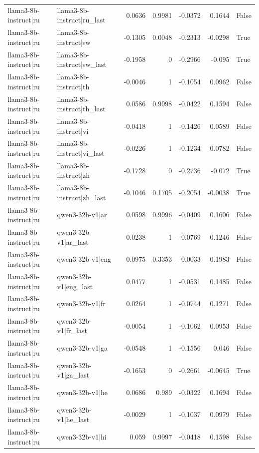 \begin{table}
\begin{tabular}{l l r r r r l}
llama3-8b-instruct|ru & llama3-8b-instruct|ru_last & 0.0636 & 0.9981 & -0.0372 & 0.1644 & False \\
llama3-8b-instruct|ru & llama3-8b-instruct|sw & -0.1305 & 0.0048 & -0.2313 & -0.0298 & True \\
llama3-8b-instruct|ru & llama3-8b-instruct|sw_last & -0.1958 & 0 & -0.2966 & -0.095 & True \\
llama3-8b-instruct|ru & llama3-8b-instruct|th & -0.0046 & 1 & -0.1054 & 0.0962 & False \\
llama3-8b-instruct|ru & llama3-8b-instruct|th_last & 0.0586 & 0.9998 & -0.0422 & 0.1594 & False \\
llama3-8b-instruct|ru & llama3-8b-instruct|vi & -0.0418 & 1 & -0.1426 & 0.0589 & False \\
llama3-8b-instruct|ru & llama3-8b-instruct|vi_last & -0.0226 & 1 & -0.1234 & 0.0782 & False \\
llama3-8b-instruct|ru & llama3-8b-instruct|zh & -0.1728 & 0 & -0.2736 & -0.072 & True \\
llama3-8b-instruct|ru & llama3-8b-instruct|zh_last & -0.1046 & 0.1705 & -0.2054 & -0.0038 & True \\
llama3-8b-instruct|ru & qwen3-32b-v1|ar & 0.0598 & 0.9996 & -0.0409 & 0.1606 & False \\
llama3-8b-instruct|ru & qwen3-32b-v1|ar_last & 0.0238 & 1 & -0.0769 & 0.1246 & False \\
llama3-8b-instruct|ru & qwen3-32b-v1|eng & 0.0975 & 0.3353 & -0.0033 & 0.1983 & False \\
llama3-8b-instruct|ru & qwen3-32b-v1|eng_last & 0.0477 & 1 & -0.0531 & 0.1485 & False \\
llama3-8b-instruct|ru & qwen3-32b-v1|fr & 0.0264 & 1 & -0.0744 & 0.1271 & False \\
llama3-8b-instruct|ru & qwen3-32b-v1|fr_last & -0.0054 & 1 & -0.1062 & 0.0953 & False \\
llama3-8b-instruct|ru & qwen3-32b-v1|ga & -0.0548 & 1 & -0.1556 & 0.046 & False \\
llama3-8b-instruct|ru & qwen3-32b-v1|ga_last & -0.1653 & 0 & -0.2661 & -0.0645 & True \\
llama3-8b-instruct|ru & qwen3-32b-v1|he & 0.0686 & 0.989 & -0.0322 & 0.1694 & False \\
llama3-8b-instruct|ru & qwen3-32b-v1|he_last & -0.0029 & 1 & -0.1037 & 0.0979 & False \\
llama3-8b-instruct|ru & qwen3-32b-v1|hi & 0.059 & 0.9997 & -0.0418 & 0.1598 & False \\

\end{tabular}
\end{table}

